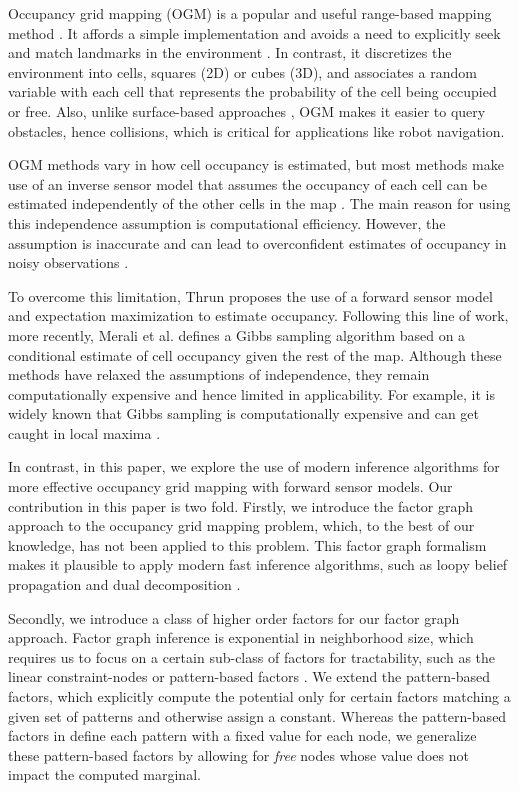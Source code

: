 \documentclass[letterpaper, 10 pt, conference]{ieeeconf} %
\begin{document}
Occupancy grid mapping (OGM) is a popular and useful range-based mapping method 
\cite{elfes1989using,moravec1988sensor}.  It affords a simple implementation and 
avoids a need to explicitly seek and match landmarks in the environment 
\cite{sugihara1988some,betke1997landmarks}. In contrast, it discretizes the
environment into cells, squares (2D) or cubes (3D), and associates a random
variable with each cell that represents the probability of the cell being
occupied or free. Also, unlike surface-based
approaches \cite{ruhnke2011highly,ryde2013voxel}, OGM makes it easier to query 
obstacles, hence collisions, which is critical for applications like robot
navigation.

OGM methods vary in how cell occupancy is estimated, but most methods make use 
of an inverse sensor model that assumes the occupancy of each cell can be 
estimated independently of the other cells in the map \cite{elfes1989using,moravec1988sensor,moravec1985high,newcombe2011kinectfusion}.  The main 
reason for using this independence assumption is computational efficiency.  
However, the assumption is inaccurate and can lead to overconfident estimates of 
occupancy in noisy observations \cite{thrun2003learning,merali2013icra}. 

To overcome this limitation, Thrun \cite{thrun2003learning} proposes the use of a forward 
sensor model and expectation maximization to estimate occupancy.  Following 
this line of work, more recently, Merali et al. \cite{merali2013icra} defines 
a Gibbs sampling algorithm based on a conditional estimate of cell occupancy 
given the rest of the map.   Although these methods have relaxed the assumptions 
of independence, they remain computationally expensive and hence limited in 
applicability.  For example, it is widely known that Gibbs sampling is 
computationally expensive and can get caught in local maxima \cite{LiBOOK2002}.

In contrast, in this paper, we explore the use of modern inference algorithms 
for more effective occupancy grid mapping with forward sensor models.
Our contribution in this paper is two fold. Firstly, we introduce the factor
graph approach to the occupancy grid mapping problem, which, to the
best of our knowledge, has not been applied to this problem.   This factor graph 
formalism makes it plausible to apply modern fast inference algorithms, such as 
loopy belief propagation \cite{kschischang2001factor} and dual decomposition 
\cite{sontag2011introduction}.  

Secondly, we introduce a class of higher order factors for our factor graph 
approach.  Factor graph inference is exponential in neighborhood size, which 
requires us to focus on a certain sub-class of factors for tractability, such 
as the linear constraint-nodes \cite{potetz2007efficient} or pattern-based 
factors \cite{komodakis2009beyond}.  We extend the pattern-based factors, 
which explicitly compute the potential only for certain factors matching a 
given set of patterns and otherwise assign a constant.  Whereas the 
pattern-based factors in \cite{komodakis2009beyond} define each pattern with 
a fixed value for each node, we generalize these pattern-based factors by 
allowing for \textit{free} nodes whose value does not impact the computed 
marginal.  
\end{document}

